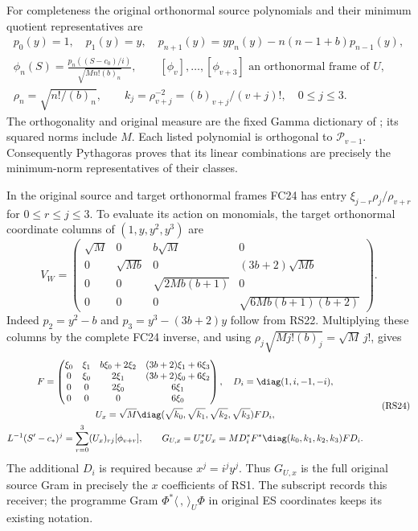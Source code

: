 For completeness the original orthonormal source polynomials
and their minimum quotient representatives are
\begin{equation}
 \begin{gathered}
 p_0(y)=1,\quad p_1(y)=y,\quad
 p_{n+1}(y)=yp_n(y)-n(n-1+b)p_{n-1}(y),\\
 \phi_n(S)=\frac{p_n((S-c_0)/i)}{\sqrt{Mn!(b)_n}},\qquad
 [\phi_v],\ldots,[\phi_{v+3}]\text{ an orthonormal frame of }U,\\
 \rho_n=\sqrt{n!/(b)_n},\qquad
 k_j=\rho_{v+j}^{-2}=(b)_{v+j}/(v+j)!,\quad0\le j\le3.
 \end{gathered}
 \tag{RS22}
\end{equation}
The orthogonality and original measure are the fixed Gamma
dictionary of \cite{WCF,DLMF18Source}; its squared norms include $M$.
Each listed polynomial is orthogonal to $\mathcal P_{v-1}$.
Consequently Pythagoras proves that its linear combinations
are precisely the minimum-norm representatives of their classes.

In the original source and target orthonormal frames FC24 has
entry $\xi_{j-r}\rho_j/\rho_{v+r}$ for $0\le r\le j\le3$.
To evaluate its action on monomials, the target orthonormal
coordinate columns of $(1,y,y^2,y^3)$ are
\begin{equation}
 V_W=\begin{pmatrix}
 \sqrt M&0&b\sqrt M&0\\
 0&\sqrt{Mb}&0&(3b+2)\sqrt{Mb}\\
 0&0&\sqrt{2Mb(b+1)}&0\\
 0&0&0&\sqrt{6Mb(b+1)(b+2)}
 \end{pmatrix}.
 \tag{RS23}
\end{equation}
Indeed $p_2=y^2-b$ and $p_3=y^3-(3b+2)y$ follow
from RS22. Multiplying these columns by the complete FC24
inverse, and using
$\rho_j\sqrt{Mj!(b)_j}=\sqrt M\,j!$, gives
\begin{equation}
 \begin{gathered}
 F=\begin{pmatrix}
 \xi_0&\xi_1&b\xi_0+2\xi_2&(3b+2)\xi_1+6\xi_3\\
 0&\xi_0&2\xi_1&(3b+2)\xi_0+6\xi_2\\
 0&0&2\xi_0&6\xi_1\\0&0&0&6\xi_0
 \end{pmatrix},\quad D_i=\diag(1,i,-1,-i),\\
 U_x=\sqrt M\diag(\sqrt{k_0},\sqrt{k_1},\sqrt{k_2},\sqrt{k_3})FD_i,\\
 L^{-1}(S'-c_*)^j=\sum_{r=0}^3(U_x)_{rj}[\phi_{v+r}],\qquad
 G_{U,x}=U_x^*U_x=M D_i^*F^*\diag(k_0,k_1,k_2,k_3)FD_i.
 \end{gathered}
 \tag{RS24}
\end{equation}
The additional $D_i$ is required because $x^j=i^jy^j$.
Thus $G_{U,x}$ is the full original source Gram in precisely
the $x$ coefficients of RS1. The subscript records this receiver;
the programme Gram $\Phi^*\langle\, ,\,\rangle_U\Phi$ in
original ES coordinates keeps its existing notation.

